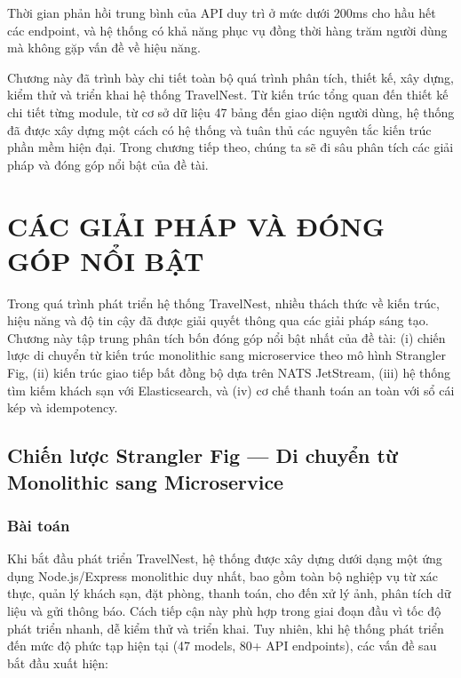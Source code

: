 \documentclass[13pt,a4paper,twoside]{report}
\begin{document}
Thời gian phản hồi trung bình của API duy trì ở mức dưới 200ms cho hầu hết các endpoint, và hệ thống có khả năng phục vụ đồng thời hàng trăm người dùng mà không gặp vấn đề về hiệu năng.

Chương này đã trình bày chi tiết toàn bộ quá trình phân tích, thiết kế, xây dựng, kiểm thử và triển khai hệ thống TravelNest. Từ kiến trúc tổng quan đến thiết kế chi tiết từng module, từ cơ sở dữ liệu 47 bảng đến giao diện người dùng, hệ thống đã được xây dựng một cách có hệ thống và tuân thủ các nguyên tắc kiến trúc phần mềm hiện đại. Trong chương tiếp theo, chúng ta sẽ đi sâu phân tích các giải pháp và đóng góp nổi bật của đề tài.


\chapter{CÁC GIẢI PHÁP VÀ ĐÓNG GÓP NỔI BẬT}

Trong quá trình phát triển hệ thống TravelNest, nhiều thách thức về kiến trúc, hiệu năng và độ tin cậy đã được giải quyết thông qua các giải pháp sáng tạo. Chương này tập trung phân tích bốn đóng góp nổi bật nhất của đề tài: (i) chiến lược di chuyển từ kiến trúc monolithic sang microservice \cite{microservices_newman} theo mô hình Strangler Fig, (ii) kiến trúc giao tiếp bất đồng bộ dựa trên NATS JetStream, (iii) hệ thống tìm kiếm khách sạn với Elasticsearch, và (iv) cơ chế thanh toán an toàn với sổ cái kép và idempotency.

\section{Chiến lược Strangler Fig --- Di chuyển từ Monolithic sang Microservice}

\subsection{Bài toán}

Khi bắt đầu phát triển TravelNest, hệ thống được xây dựng dưới dạng một ứng dụng Node.js/Express monolithic duy nhất, bao gồm toàn bộ nghiệp vụ từ xác thực, quản lý khách sạn, đặt phòng, thanh toán, cho đến xử lý ảnh, phân tích dữ liệu và gửi thông báo. Cách tiếp cận này phù hợp trong giai đoạn đầu vì tốc độ phát triển nhanh, dễ kiểm thử và triển khai. Tuy nhiên, khi hệ thống phát triển đến mức độ phức tạp hiện tại (47 models, 80+ API endpoints), các vấn đề sau bắt đầu xuất hiện:
\end{document}
